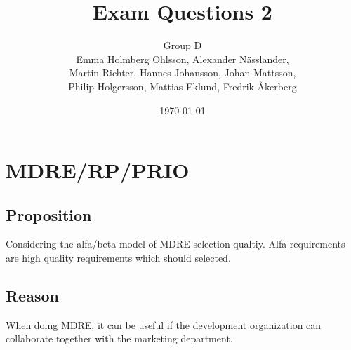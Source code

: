 \documentclass[a4paper]{article}
\title{Exam Questions 2}
\author{Group D\\ Emma Holmberg Ohlsson, Alexander Nässlander,\\Martin Richter, Hannes Johansson, Johan Mattsson,\\Philip Holgersson, Mattias Eklund, Fredrik Åkerberg}
\date{\today}
\begin{document}
	\maketitle
	\thispagestyle{empty}
	\setcounter{page}{0}
	\pagebreak


\section{MDRE/RP/PRIO}
\subsection*{Proposition}
Considering the alfa/beta model of MDRE selection qualtiy. Alfa requirements are high quality requirements which should selected.
\subsection*{Reason}
When doing MDRE, it can be useful if the development organization can collaborate together with the marketing department.
\end{document}

